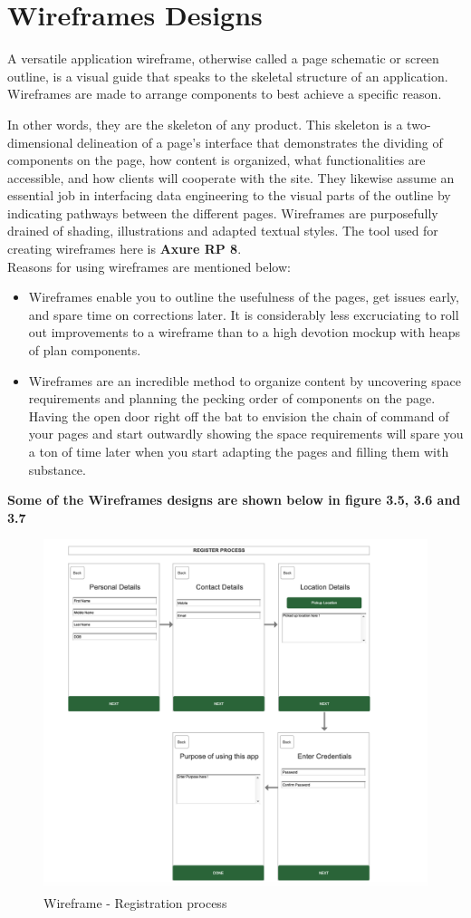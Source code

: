\section{Wireframes Designs}

A versatile application wireframe, otherwise called a page schematic or screen outline, is a visual guide that speaks to the skeletal structure of an application. Wireframes are made to arrange components to best achieve a specific reason.

In other words, they are the skeleton of any product. This skeleton is a two-dimensional delineation of a page's interface that demonstrates the dividing of components on the page, how content is organized, what functionalities are accessible, and how clients will cooperate with the site. They likewise assume an essential job in interfacing data engineering to the visual parts of the outline by indicating pathways between the different pages. Wireframes are purposefully drained of shading, illustrations and adapted textual styles. The tool used for creating wireframes here is \textbf{Axure RP 8}. \\

Reasons for using wireframes are mentioned below:

\begin{itemize}
    \item Wireframes enable you to outline the usefulness of the pages, get issues early, and spare time on corrections later. It is considerably less excruciating to roll out improvements to a wireframe than to a high devotion mockup with heaps of plan components. \\
    
    \item Wireframes are an incredible method to organize content by uncovering space requirements and planning the pecking order of components on the page. Having the open door right off the bat to envision the chain of command of your pages and start outwardly showing the space requirements will spare you a ton of time later when you start adapting the pages and filling them with substance. \\
\end{itemize}

\centerline{\textbf{Some of the Wireframes designs are shown below in figure 3.5, 3.6 and 3.7}} 

    \begin{figure}[H]
            \centering
            \includegraphics[width=0.5\linewidth]{figures/ch3/wireframe_1.png}
            \caption{\label{fig:wireframe_1} Wireframe - Registration process}
    \end{figure}
  
